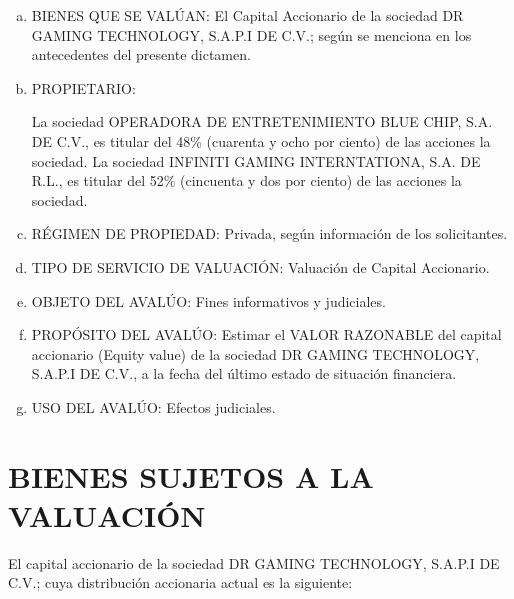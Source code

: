 \documentclass[10pt,letter]{report}
\begin{document}
\begin{enumerate}[a.]
\item BIENES QUE SE VALÚAN: El Capital Accionario de la sociedad DR GAMING TECHNOLOGY, S.A.P.I DE C.V.; según se menciona en los antecedentes del presente dictamen. 

\item PROPIETARIO: 

La sociedad OPERADORA DE ENTRETENIMIENTO BLUE CHIP, S.A. DE C.V., es titular del 48\% (cuarenta y ocho por ciento) de las acciones la sociedad.
La sociedad INFINITI GAMING INTERNTATIONA, S.A. DE R.L., es titular del 52\% (cincuenta y dos por ciento) de las acciones la sociedad.

\item RÉGIMEN DE PROPIEDAD: Privada, según información de los solicitantes.

\item TIPO DE SERVICIO DE VALUACIÓN: Valuación de Capital Accionario.

\item OBJETO DEL AVALÚO: Fines informativos y judiciales.

\item PROPÓSITO DEL AVALÚO: Estimar el VALOR RAZONABLE del capital accionario (Equity value) de la sociedad DR GAMING TECHNOLOGY, S.A.P.I DE C.V., a la fecha del último estado de situación financiera.

\item USO DEL AVALÚO: Efectos judiciales.

\end{enumerate}

\section{BIENES SUJETOS A LA VALUACIÓN}

El capital accionario de la sociedad DR GAMING TECHNOLOGY, S.A.P.I DE C.V.; cuya distribución accionaria actual es la siguiente:
\end{document}
